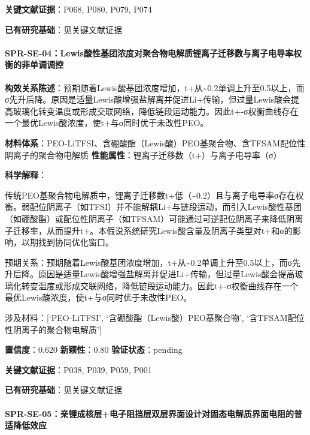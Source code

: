 \documentclass[12pt,a4paper]{ctexart}
\begin{document}
\textbf{关键文献证据}：P068, P080, P079, P074

\textbf{已有研究基础}：见关键文献证据

\paragraph{SPR-SE-04：Lewis酸性基团浓度对聚合物电解质锂离子迁移数与离子电导率权衡的非单调调控}\label{spr-se-04lewisux9178ux6027ux57faux56e2ux6d53ux5ea6ux5bf9ux805aux5408ux7269ux7535ux89e3ux8d28ux9502ux79bbux5b50ux8fc1ux79fbux6570ux4e0eux79bbux5b50ux7535ux5bfcux7387ux6743ux8861ux7684ux975eux5355ux8c03ux8c03ux63a7}

\textbf{构效关系陈述}：预期随着Lewis酸基团浓度增加，t+从\textasciitilde0.2单调上升至0.5以上，而σ先升后降。原因是适量Lewis酸增强盐解离并促进Li+传输，但过量Lewis酸会提高玻璃化转变温度或形成交联网络，降低链段运动能力。因此t+-σ权衡曲线存在一个最优Lewis酸浓度，使t+与σ同时优于未改性PEO。

\textbf{材料体系}：PEO-LiTFSI、含硼酸酯（Lewis酸）PEO基聚合物、含TFSAM配位性阴离子的聚合物电解质 \textbar{} \textbf{性能属性}：锂离子迁移数（t+）与离子电导率（σ）

\textbf{科学解释}：

传统PEO基聚合物电解质中，锂离子迁移数t+低（\textasciitilde0.2）且与离子电导率σ存在权衡。弱配位阴离子（如TFSI）并不能解耦Li+与链段运动，而引入Lewis酸性基团（如硼酸酯）或配位性阴离子（如TFSAM）可能通过可逆配位阴离子来降低阴离子迁移率，从而提升t+。本假说系统研究Lewis酸含量及阴离子类型对t+和σ的影响，以期找到协同优化窗口。

预期关系：预期随着Lewis酸基团浓度增加，t+从\textasciitilde0.2单调上升至0.5以上，而σ先升后降。原因是适量Lewis酸增强盐解离并促进Li+传输，但过量Lewis酸会提高玻璃化转变温度或形成交联网络，降低链段运动能力。因此t+-σ权衡曲线存在一个最优Lewis酸浓度，使t+与σ同时优于未改性PEO。

涉及材料：{[}`PEO-LiTFSI', `含硼酸酯（Lewis酸）PEO基聚合物', `含TFSAM配位性阴离子的聚合物电解质'{]}

\textbf{置信度}：0.620 \textbar{} \textbf{新颖性}：0.80 \textbar{} \textbf{验证状态}：pending

\textbf{关键文献证据}：P038, P039, P059, P001

\textbf{已有研究基础}：见关键文献证据

\paragraph{SPR-SE-05：亲锂成核层+电子阻挡层双层界面设计对固态电解质界面电阻的普适降低效应}\label{spr-se-05ux4eb2ux9502ux6210ux6838ux5c42ux7535ux5b50ux963bux6321ux5c42ux53ccux5c42ux754cux9762ux8bbeux8ba1ux5bf9ux56faux6001ux7535ux89e3ux8d28ux754cux9762ux7535ux963bux7684ux666eux9002ux964dux4f4eux6548ux5e94}
\end{document}
